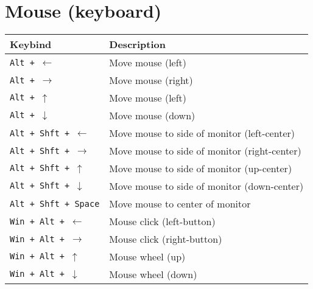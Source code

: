 \documentclass[letterpaper,12pt]{article}
\begin{document}
\section*{Mouse (keyboard)}
\begin{table}[H]
  \begin{tabular}{|C{5cm}|L{10cm}|}
    \hline
    \textbf{Keybind} & \textbf{Description} \\
    \hline
    {\tt Alt + $\leftarrow$} & Move mouse (left) \\
    {\tt Alt + $\rightarrow$} & Move mouse (right) \\
    {\tt Alt + $\uparrow$} & Move mouse (left) \\
    {\tt Alt + $\downarrow$} & Move mouse (down) \\
    \hline
    {\tt Alt + Shft + $\leftarrow$} & Move mouse to side of monitor (left-center) \\
    {\tt Alt + Shft + $\rightarrow$} & Move mouse to side of monitor (right-center) \\
    {\tt Alt + Shft + $\uparrow$} & Move mouse to side of monitor (up-center) \\
    {\tt Alt + Shft + $\downarrow$} & Move mouse to side of monitor (down-center) \\
    {\tt Alt + Shft + Space} & Move mouse to center of monitor \\
    \hline
    {\tt Win + Alt + $\leftarrow$} & Mouse click (left-button) \\
    {\tt Win + Alt + $\rightarrow$} & Mouse click (right-button) \\
    {\tt Win + Alt + $\uparrow$} & Mouse wheel (up) \\
    {\tt Win + Alt + $\downarrow$} & Mouse wheel (down) \\
    \hline
  \end{tabular}
\end{table}
\end{document}

